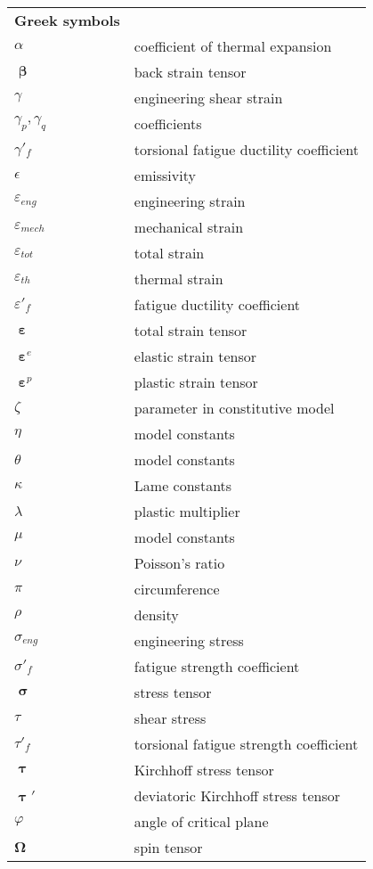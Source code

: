 \renewcommand\arraystretch{1.0}

\begin{table}[htb]
  \centering
    \begin{tabular}{p{3cm}p{10.5cm}}
    \textbf{Greek symbols} & \\
    $\alpha$ & coefficient of thermal expansion \\
    $\bm{\upbeta}$ & back strain tensor \\
    $\gamma$ & engineering shear strain \\
    $\gamma_p, \gamma_q$ & coefficients \\
    $\gamma'_f$ & torsional fatigue ductility coefficient \\
    $\epsilon$ & emissivity \\
    $\varepsilon_{eng}$  & engineering strain \\
    $\varepsilon_{mech}$ & mechanical strain \\
    $\varepsilon_{tot}$ & total strain \\
    $\varepsilon_{th}$ & thermal strain \\
    $\varepsilon'_f$ & fatigue ductility coefficient \\
    $\bm{\upepsilon}$ & total strain tensor \\
    $\bm{\upepsilon}^e$ & elastic strain tensor \\
    $\bm{\upepsilon}^p$ & plastic strain tensor \\
    $\zeta$ & parameter in constitutive model \\
    $\eta$ & model constants \\
    $\theta$ & model constants \\
    $\kappa$ & Lame constants \\
    $\lambda$ & plastic multiplier \\
    $\mu$ & model constants \\
    $\nu$ & Poisson's ratio \\
    $\pi$ & circumference \\
    $\rho$ & density \\
    $\sigma_{eng}$  & engineering stress \\
    $\sigma'_f$ & fatigue strength coefficient \\
    $\bm{\upsigma}$ & stress tensor \\
    $\tau$  & shear stress \\
    $\tau'_f$ & torsional fatigue strength coefficient \\
    $\bm{\uptau}$ & Kirchhoff stress tensor \\
    $\bm{\uptau}'$ & deviatoric Kirchhoff stress tensor \\
    $\varphi$ & angle of critical plane \\
    $\bm{\Omega}$ & spin tensor \\
    \end{tabular}%
  \label{Tab:greek_1}%
\end{table}%

